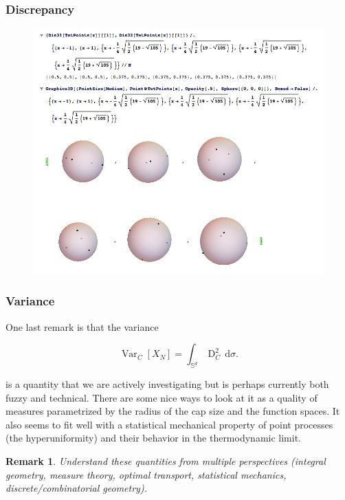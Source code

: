 \documentclass{beamer}
\newtheorem{remark}[equation]{Remark}
\theoremstyle{definition}
\begin{document}
\frame
{
\frametitle{Discrepancy}
\begin{figure}[htbp]
   \centering
   \includegraphics[scale=.2]{optsimp.jpeg} %
\end{figure}

}

\frame
{
\frametitle{Variance}
One last remark is that the variance

\[
\operatorname{Var}_C[X_N] = \int_{\mathbb{S}^{d}} \operatorname{D}_C^2 \,\mathrm{d} \sigma.
\]

is a quantity that we are actively investigating but is perhaps currently both fuzzy and technical.  There are some nice ways to look at it as a quality of measures parametrized by the radius of the cap size and the function spaces.  It also seems to fit well with a statistical mechanical property of point processes (the hyperuniformity) and their behavior in the thermodynamic limit.\begin{remark}Understand these quantities from multiple perspectives (integral geometry, measure theory, optimal transport, statistical mechanics, discrete/combinatorial geometry).\end{remark}
}

\end{document}
